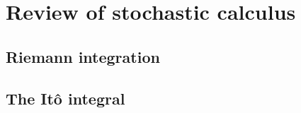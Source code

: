 
\section{Review of stochastic calculus}
\subsection{Riemann integration}
\subsection{The It\^o integral}
